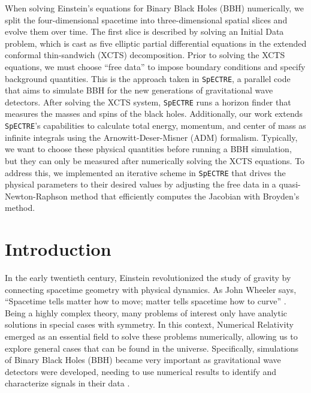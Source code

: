 \documentclass{../document}
\begin{document}
    When solving Einstein's equations for Binary Black Holes (BBH) numerically, we split the four-dimensional spacetime into three-dimensional spatial slices and evolve them over time. The first slice is described by solving an Initial Data problem, which is cast as five elliptic partial differential equations in the extended conformal thin-sandwich (XCTS) decomposition. Prior to solving the XCTS equations, we must choose ``free data'' to impose boundary conditions and specify background quantities. This is the approach taken in {\tt SpECTRE}, a parallel code that aims to simulate BBH for the new generations of gravitational wave detectors. After solving the XCTS system, {\tt SpECTRE} runs a horizon finder that measures the masses and spins of the black holes. Additionally, our work extends {\tt SpECTRE}'s capabilities to calculate total energy, momentum, and center of mass as infinite integrals using the Arnowitt-Deser-Misner (ADM) formalism. Typically, we want to choose these physical quantities before running a BBH simulation, but they can only be measured after numerically solving the XCTS equations. To address this, we implemented an iterative scheme in {\tt SpECTRE} that drives the physical parameters to their desired values by adjusting the free data in a quasi-Newton-Raphson method that efficiently computes the Jacobian with Broyden's method.

  \section{Introduction}
    
    In the early twentieth century, Einstein revolutionized the study of gravity by connecting spacetime geometry with physical dynamics. As John Wheeler says, ``Spacetime tells matter how to move; matter tells spacetime how to curve'' \cite{Wheeler}. Being a highly complex theory, many problems of interest only have analytic solutions in special cases with symmetry. In this context, Numerical Relativity emerged as an essential field to solve these problems numerically, allowing us to explore general cases that can be found in the universe. Specifically, simulations of Binary Black Holes (BBH) became very important as gravitational wave detectors were developed, needing to use numerical results to identify and characterize signals in their data \cite{LIGO}.
\end{document}
